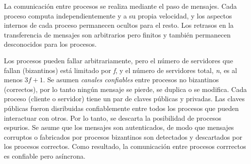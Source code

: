 La comunicación entre procesos se realiza mediante el paso de mensajes.
Cada proceso computa independientemente y a su propia velocidad, y los aspectos internos de cada proceso
permanecen ocultos para el resto. Los retrasos en la transferencia de mensajes son arbitrarios pero finitos
y también permanecen desconocidos para los procesos.

Los procesos pueden fallar arbitrariamente, pero el número de servidores que fallan (bizantinos) está
limitado por \textit{f}, y el número de servidores total, \textit{n}, es al menos $3f + 1$.
Se asumen \textit{canales confiables} entre procesos no bizantinos (correctos), por lo tanto ningún
mensaje se pierde, se duplica o se modifica.
Cada proceso (cliente o servidor) tiene un par de claves públicas y privadas.
Las claves públicas fueron disribuidas confiablemente entre todos los procesos que pueden interactuar
con otros.
Por lo tanto, se descarta la posibilidad de procesos espurios.
Se asume que los mensajes son autenticados, de modo que mensajes corruptos o fabricados por
procesos bizantinos son detectados y descartados por los procesos correctos.
Como resultado, la comunicación entre procesos corrrectos es confiable pero asíncrona.

